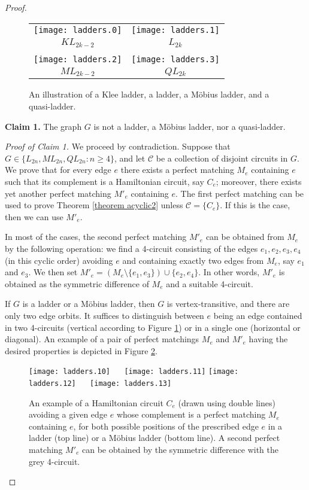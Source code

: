 \documentclass[]{theclass}
\begin{document}
\begin{proof}
\begin{figure}[ht]
\centering
\begin{tabular}{cc}
     \texttt{[image: ladders.0]}&\texttt{[image: ladders.1]}  \\
     $KL_{2k-2}$     &  $L_{2k}$ \\
     & \\
     \texttt{[image: ladders.2]}&\texttt{[image: ladders.3]}  \\
     $ML_{2k-2}$     &  $QL_{2k}$ 
\end{tabular}
    \caption{An illustration of a Klee ladder, a ladder, a M\"obius ladder, and a quasi-ladder.}
    \label{fig:ladders}
\end{figure}

\noindent\textbf{Claim 1.} The graph $G$ is not a ladder, a M\"obius ladder, nor a quasi-ladder.

\noindent\emph{Proof of Claim 1.} 
We proceed by contradiction. Suppose that $G\in\{{L}_{2n}, {ML}_{2n}, QL_{2n}: n\geq 4\}$, and let $\mathcal{C}$ be a collection of disjoint circuits in $G$. 
We prove that for every edge $e$ there exists a perfect matching $M_e$ containing $e$ such that its complement is a Hamiltonian circuit, say $C_e$; moreover, there exists yet another perfect matching $M'_e$ containing $e$. The first perfect matching can be used to prove Theorem \ref{theorem acyclic2} unless $\mathcal{C}= \{C_e\}$. If this is the case, then we can use $M'_e$.

In most of the cases, the second perfect matching $M'_e$ can be obtained from $M_e$ by the following operation: we find a 4-circuit consisting of the edges $e_1, e_2, e_3, e_4$ (in this cyclic order) avoiding $e$ and containing exactly two edges from $M_e$, say $e_1$ and $e_3$. We then set $M'_e=(M_e \setminus \{e_1,e_3\}) \cup \{e_2,e_4\}$. In other words, $M'_e$ is obtained as the symmetric difference of $M_e$ and a suitable 4-circuit.

If $G$ is a ladder or a M\"obius ladder, then $G$ is vertex-transitive, and there are only two edge orbits. It suffices to distinguish between $e$ being an edge contained in two 4-circuits (vertical according to Figure \ref{fig:ladders}) or in a single one (horizontal or diagonal). An example of a pair of perfect matchings $M_e$ and $M'_e$ having the desired properties is depicted in Figure \ref{fig:ladder}.

\begin{figure}[ht]
    \centering
    \texttt{[image: ladders.10]} $\quad$
    \texttt{[image: ladders.11]}
    \texttt{[image: ladders.12]} $\quad$
    \texttt{[image: ladders.13]}
    \caption{An example of a Hamiltonian circuit $C_e$ (drawn using double lines) avoiding a given edge $e$ whose complement is a perfect matching $M_e$ containing $e$, for both possible positions of the prescribed edge $e$ in a ladder (top line) or a M\"obius ladder (bottom line). A second perfect matching $M'_e$ can be obtained by the symmetric difference with the grey 4-circuit.}
    \label{fig:ladder}
\end{figure}


\end{proof}
\end{document}
